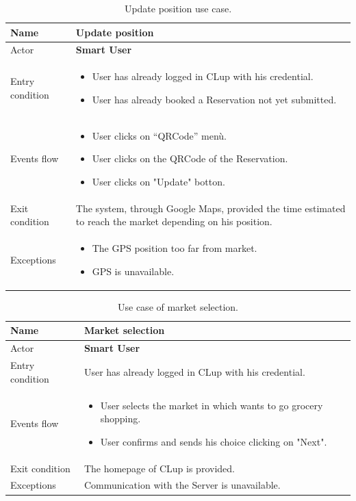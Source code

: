 \begin{table}[H]\begin{tabular}{|p{5cm} | p{7cm} | }
	\hline
	Name & \textbf{Update position}  \\
	\hline
	Actor & \textbf{Smart User} \\
	\hline
	Entry condition &
	\begin{itemize}
	    \item User has already logged in CLup with his credential. 
		\item User has already booked a Reservation not yet submitted.
        \end{itemize} \\
	\hline
	Events flow & 
	\begin{itemize}
		\item User clicks on “QRCode” menù.
        \item User clicks on the QRCode of the Reservation.
        \item User clicks on "Update" botton.
	\end{itemize} \\
	\hline
	Exit condition &
	The system, through Google Maps, provided the time estimated to reach the market depending on his position. \\
	\hline 
	Exceptions & 
	\begin{itemize}
		\item The GPS position too far from market.
		\item GPS is unavailable.
	\end{itemize} \\
	\hline
\end{tabular}
\caption{Update position use case.}

\end{table}

\bigbreak

\begin{table}[H]\begin{tabular}{|p{5cm} | p{7cm} | }
	\hline
	Name & \textbf{Market selection}  \\
	\hline
	Actor & \textbf{Smart User} \\
	\hline
	Entry condition & User has already logged in CLup with his credential. \\
	\hline
	Events flow & 
	\begin{itemize}
		\item User selects the market in which wants to go grocery shopping.
		\item User confirms and sends his choice clicking on "Next". 
	\end{itemize} \\
	\hline
	Exit condition &
	The homepage of CLup is provided.  \\
	\hline 
	Exceptions & Communication with the Server is unavailable.\\
	\hline
\end{tabular}
\caption{Use case of market selection.}
\end{table}


